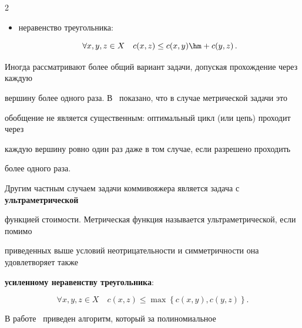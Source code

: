\begin{multicols}{2}
\begin{itemize}
\noindent


$$


\forall x,y \in X \quad c(x,y)= c(y,x)\,;


$$


\item


неравенство треугольника:





\vspace*{2pt}





\noindent


$$


\forall x,y,z \in X \quad c(x,z) \leq c(x,y)\hm + c(y,z)\,.


$$


\end{itemize}





Иногда рассматривают более общий вариант задачи, допуская прохождение через каждую


вершину более одного раза. В~\cite{Meinika} показано, что в случае мет\-ри\-че\-ской задачи это


обобщение не является существенным: оптимальный цикл (или цепь) проходит через


каждую вершину ровно один раз даже в том случае, если разрешено проходить


более одного \mbox{раза}.





Другим частным случаем задачи коммивояжера является задача с \textbf{ульт\-ра\-мет\-рической}


функцией стоимости. Метрическая функция называется ульт\-ра\-мет\-ри\-че\-ской, если помимо


приведенных выше условий неотрицательности и симметричности она удовлетворяет также


\textbf{усиленному неравенству треугольника}:


$$


\forall x,y,z \in X \quad c(x,z) \leq \max\left\{c(x,y), c(y,z)\right\}.


$$





В работе~\cite{Gusfield} приведен алгоритм, который за полиномиальное



\end{multicols}
